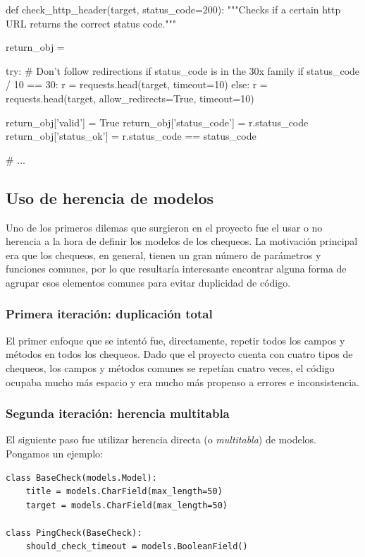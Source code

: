 \begin{pythoncode}
def check_http_header(target, status_code=200):
    """Checks if a certain http URL returns the correct status code."""

    return_obj = {}

    try:
        # Don't follow redirections if status_code is in the 30x family
        if status_code / 10 == 30:
            r = requests.head(target, timeout=10)
        else:
            r = requests.head(target, allow_redirects=True, timeout=10)

        return_obj['valid'] = True
        return_obj['status_code'] = r.status_code
        return_obj['status_ok'] = r.status_code == status_code  

    # ...
\end{pythoncode}


\subsection{Uso de herencia de modelos}

Uno de los primeros dilemas que surgieron en el proyecto fue el usar o no
herencia a la hora de definir los modelos de los chequeos. La motivación
principal era que los chequeos, en general, tienen un gran número de parámetros
y funciones comunes, por lo que resultaría interesante encontrar alguna forma de
agrupar esos elementos comunes para evitar duplicidad de código.

\subsubsection{Primera iteración: duplicación total}

El primer enfoque que se intentó fue, directamente, repetir todos los campos y
métodos en todos los chequeos. Dado que el proyecto cuenta con cuatro tipos de
chequeos, los campos y métodos comunes se repetían cuatro veces, el código
ocupaba mucho más espacio y era mucho más propenso a errores e inconsistencia.

\subsubsection{Segunda iteración: herencia multitabla}

El siguiente paso fue utilizar herencia directa (o \textit{multitabla}) de
modelos. Pongamos un ejemplo:

\begin{verbatim}
class BaseCheck(models.Model):
    title = models.CharField(max_length=50)
    target = models.CharField(max_length=50)

class PingCheck(BaseCheck):
    should_check_timeout = models.BooleanField()
\end{verbatim}

